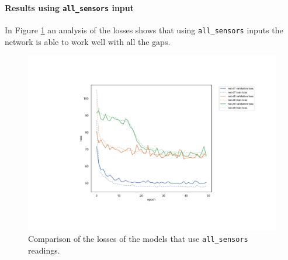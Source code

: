 \paragraph*{Results using \texttt{all\_sensors} input}
In Figure \ref{fig:distlossall} an analysis of the losses shows that using 
\texttt{all\_sensors} inputs the network is able to work well with all the 
gaps. 
\begin{figure}[!htb]
	\centering
	\includegraphics[width=.8\textwidth]{contents/images/task1/loss-distributed-all_sensors@}%
	\caption{Comparison of the losses of the models that use \texttt{all\_sensors} 
		readings.}
	\label{fig:distlossall}
\end{figure}

